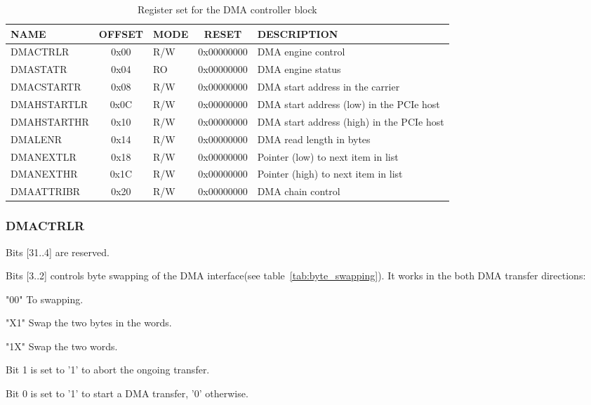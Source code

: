 \documentclass[10pt,a4paper]{cerndoc}
\begin{document}
\begin{table}[htbp]
  \centering
  \begin{tabularx}{\textwidth}{|l|c|l|c|X|}                                                   \hline
    \textbf{NAME}  & \textbf{OFFSET} & \textbf{MODE} & \textbf{RESET} & \textbf{DESCRIPTION}  \\ \hline \hline
    DMACTRLR       & 0x00 & R/W & 0x00000000 & DMA engine control                                       \\ \hline
    DMASTATR       & 0x04 & RO  & 0x00000000 & DMA engine status                                              \\ \hline
    DMACSTARTR     & 0x08 & R/W & 0x00000000 & DMA start address in the carrier                               \\ \hline
    DMAHSTARTLR    & 0x0C & R/W & 0x00000000 & DMA start address (low) in the PCIe host                       \\ \hline
    DMAHSTARTHR    & 0x10 & R/W & 0x00000000 & DMA start address (high) in the PCIe host                      \\ \hline
    DMALENR        & 0x14 & R/W & 0x00000000 & DMA read length in bytes                                       \\ \hline
    DMANEXTLR      & 0x18 & R/W & 0x00000000 & Pointer (low) to next item in list                             \\ \hline
    DMANEXTHR      & 0x1C & R/W & 0x00000000 & Pointer (high) to next item in list                            \\ \hline
    DMAATTRIBR     & 0x20 & R/W & 0x00000000 & DMA chain control                                              \\ \hline
  \end{tabularx}
  \caption{Register set for the DMA controller block}
  \label{tab:dma_control}
\end{table}


\newpage
\subsubsection{DMACTRLR}
\begin{packed_item}
\item Bits [31..4] are reserved.
\item Bits [3..2] controls byte swapping of the DMA interface(see table~\ref{tab:byte_swapping}). It works in the both DMA transfer directions:
  \begin{packed_item}
    \item "00" To swapping.
    \item "X1" Swap the two bytes in the words.
    \item "1X" Swap the two words.
  \end{packed_item}
\item Bit 1 is set to '1' to abort the ongoing transfer.
\item Bit 0 is set to '1' to start a DMA transfer, '0' otherwise.
\end{packed_item}
\end{document}
